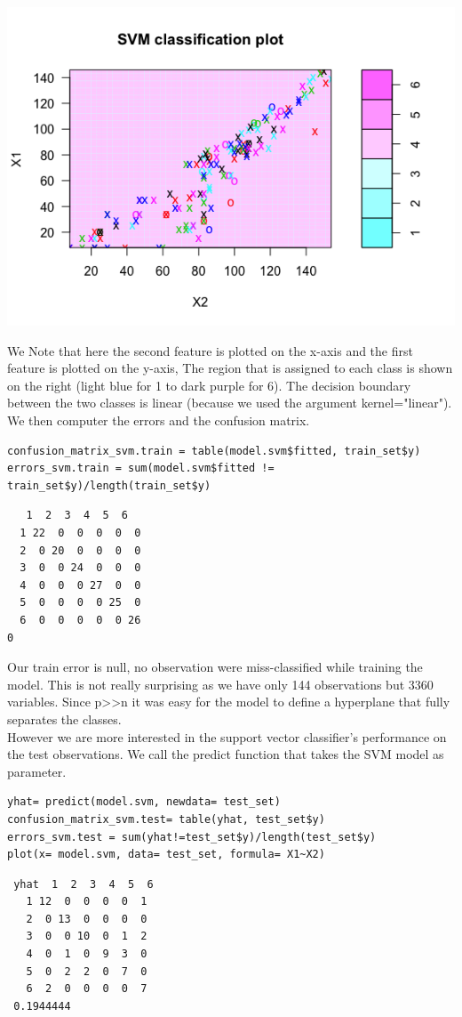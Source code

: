 \documentclass[]{report}
\begin{document}
\begin{center}
	\includegraphics[width=0.8\linewidth]{Figures/svm_train_plot.png}
	\label{SVM on train set}
\end{center}

We Note that here the second feature is plotted on the x-axis and the first feature is plotted on the y-axis, 
The region that is assigned to each class is shown on the right (light blue for 1 to dark purple for 6). The decision boundary between the two classes is linear 
(because we used the argument kernel="linear"). 
\\We then computer the errors and the confusion matrix.
\pagebreak
\begin{lstlisting}
confusion_matrix_svm.train = table(model.svm$fitted, train_set$y)
errors_svm.train = sum(model.svm$fitted != train_set$y)/length(train_set$y)
\end{lstlisting}
\begin{verbatim}
   1  2  3  4  5  6
  1 22  0  0  0  0  0
  2  0 20  0  0  0  0
  3  0  0 24  0  0  0
  4  0  0  0 27  0  0
  5  0  0  0  0 25  0
  6  0  0  0  0  0 26
0
\end{verbatim}
Our train error is null, no observation were miss-classified while training the model. This is not really surprising as we have only 144 observations but 3360 variables. Since p>>n it was easy for the model to define a hyperplane that fully separates the classes. \\

However we are more interested in the support vector classifier’s performance on the test observations. We call the predict function that takes the SVM model as parameter.
\begin{lstlisting}
yhat= predict(model.svm, newdata= test_set)
confusion_matrix_svm.test= table(yhat, test_set$y)
errors_svm.test = sum(yhat!=test_set$y)/length(test_set$y)
plot(x= model.svm, data= test_set, formula= X1~X2)
\end{lstlisting}
\begin{verbatim}
 yhat  1  2  3  4  5  6
   1 12  0  0  0  0  1
   2  0 13  0  0  0  0
   3  0  0 10  0  1  2
   4  0  1  0  9  3  0
   5  0  2  2  0  7  0
   6  2  0  0  0  0  7
 0.1944444
\end{verbatim}
\end{document}
